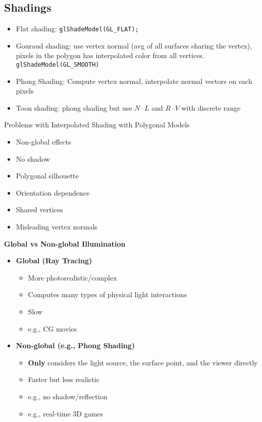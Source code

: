 \documentclass[10pt,twocolumn]{extarticle}
\begin{document}
\subsection*{Shadings}
\begin{itemize}
  \item Flat shading: \texttt{glShadeModel(GL\_FLAT);}
  \item Gouraud shading: use vertex normal (avg of all surfaces sharing the vertex), pixels in the polygon has interpolated color from all vertices. \texttt{glShadeModel(GL\_SMOOTH)}
  \item Phong Shading: Compute vertex normal, interpolate normal vectors on each pixels
  \item Toon shading: phong shading but use $N\cdot L$ and $R\cdot V$ with discrete range 
\end{itemize}
Problems with Interpolated Shading with Polygonal Models
\begin{itemize}
  \item Non-global effects
  \item No shadow
  \item Polygonal silhouette
  \item Orientation dependence
  \item Shared vertices
  \item Misleading vertex normals
\end{itemize}
\textbf{Global vs Non-global Illumination}
\begin{itemize}
  \item \textbf{Global (Ray Tracing)}
  \begin{itemize}
    \item More photorealistic/complex
    \item Computes many types of physical light interactions
    \item Slow
    \item e.g., CG movies
  \end{itemize}
  \item \textbf{Non-global (e.g., Phong Shading)}
  \begin{itemize}
    \item \textbf{Only} considers the light source, the surface point, and the viewer directly
    \item Faster but less realistic
    \item e.g., no shadow/reflection
    \item e.g., real-time 3D games
  \end{itemize}
\end{itemize}
\end{document}
